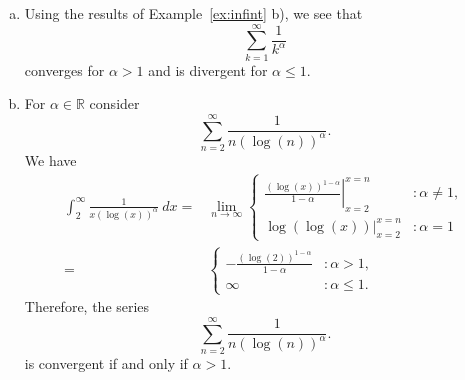 \begin{example}
\begin{enumerate}[a)]
\item Using the results of Example~\ref{ex:infint} b), we see that
\[\sum_{k=1}^\infty\frac1{k^\alpha}\]
converges for $\alpha>1$ and is divergent for $\alpha\leq1$.
\item For $\alpha\in\mathbb{R}$ consider
\[\sum_{n=2}^\infty\frac1{n(\log(n))^\alpha}.\]
We have
\[
\begin{aligned}
\int_2^\infty\frac1{x(\log(x))^\alpha}~dx=&\lim_{n\to\infty}\begin{cases}\left.\frac{(\log(x))^{1-\alpha}}{1-\alpha}\right|_{x=2}^{x=n}&:\alpha\neq1,\\
\left.\log(\log(x))\right|_{x=2}^{x=n}&:\alpha=1\end{cases}\\
=&\begin{cases}-\frac{(\log(2))^{1-\alpha}}{1-\alpha}&:\alpha>1,\\
\infty&:\alpha\leq1.\end{cases}
\end{aligned}
\]
Therefore, the series \[\sum_{n=2}^\infty\frac1{n(\log(n))^\alpha}.\]
is convergent if and only if $\alpha>1$.
\end{enumerate}
\end{example}

